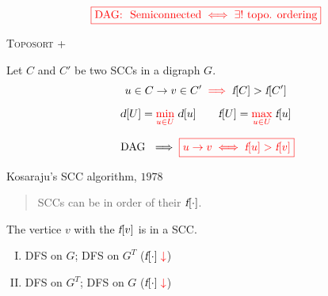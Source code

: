 \begin{frame}{}
  \[
    \textcolor{red}{\boxed{\text{DAG: } \text{ Semiconnected} \iff \exists! \text{ topo. ordering}}}
  \]

  \pause
  \vspace{0.80cm}
  \centerline{\textsc{Toposort} + }

  \pause
  \vspace{0.30cm}
\end{frame}

\begin{frame}{}
  \centerline{}

  \begin{lemma}[$22.14$]
    \begin{center}
      Let $C$ and $C'$ be two SCCs in a digraph $G$.
      \[
	u \in C \to v \in C' \textcolor{red}{\;\implies\;} \textsl{f}[C] > \textsl{f}[C']
      \]
    \end{center}
  \end{lemma}

  \pause
  \vspace{0.30cm}
  \[
    \textsl{d}[U] = \textcolor{red}{\min\limits_{u \in U}}\; \textsl{d}[u] \qquad \textsl{f}[U] = \textcolor{red}{\max\limits_{u \in U}}\; \textsl{f}[u]
  \]

  \pause
  \vspace{0.30cm}
  \[
    \text{ DAG } \implies \textcolor{red}{\boxed{u \to v \iff \textsl{f}[u] > \textsl{f}[v]}}
  \]
\end{frame}

\begin{frame}{}
  \begin{exampleblock}{Kosaraju's SCC algorithm, $1978$}
    \begin{quote}
      \begin{center}
	{\large SCCs can be  in  order of their $\textsl{f}[\cdot]$.}
      \end{center}
    \end{quote}
  \end{exampleblock}

  \pause
  \vspace{0.60cm}
  \centerline{The vertice $v$ with the  $\textsl{f}[v]$ is in a  SCC.}

  \pause
  \vspace{0.60cm}
  \begin{enumerate}[(I)]
    \centering
      \item DFS on $G$; \; DFS on $G^{T}$ ($\textsl{f}[\cdot] \textcolor{red}{\;\downarrow}$) \\[8pt]
      \pause
      \item DFS on $G^{T}$;\; DFS on $G$ \pause ($\textsl{f}[\cdot] \textcolor{red}{\;\downarrow}$)
  \end{enumerate}
\end{frame}

